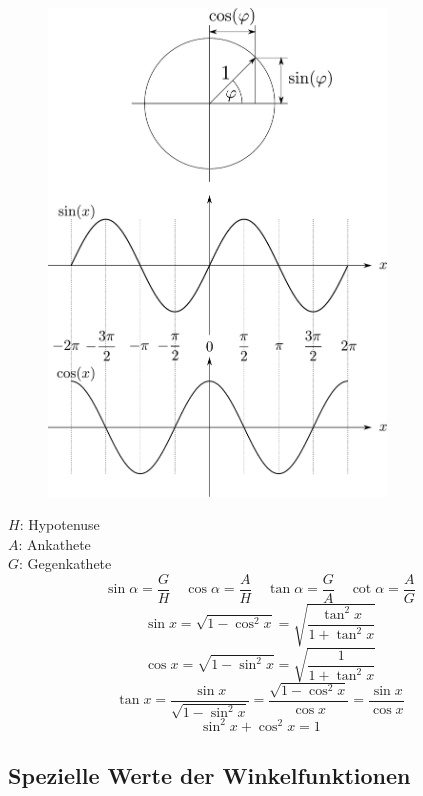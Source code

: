 \begin{figure}[h!]
\centering
\includegraphics[width=0.8\textwidth]{einheitskreis.pdf}
\end{figure}

\noindent
$H$: Hypotenuse\\
$A$: Ankathete\\
$G$: Gegenkathete
\[ \boxed{\sin\alpha=\frac{G}{H}} \quad \boxed{\cos\alpha=\frac{A}{H}} \quad \boxed{\tan\alpha=\frac{G}{A}} \quad \boxed{\cot\alpha=\frac{A}{G}} \]
\[ \boxed{\sin x = \sqrt{1-\cos^2x} = \sqrt{\frac{\tan^2x}{1+\tan^2x}}} \]
\[ \boxed{\cos x = \sqrt{1-\sin^2x} = \sqrt{\frac{1}{1+\tan^2x}}} \]
\[ \boxed{\tan x = \frac{\sin x}{\sqrt{1-\sin^2x}} = \frac{\sqrt{1-\cos^2x}}{\cos x} = \frac{\sin x}{\cos x}} \]
\[ \boxed{\sin^2 x + \cos^2 x = 1} \]


\subsection{Spezielle Werte der Winkelfunktionen}

